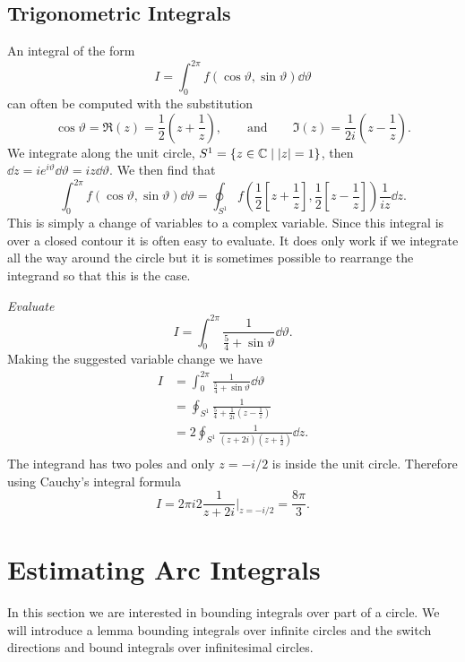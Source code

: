 \documentclass{article}
\newcommand{\st}{\mid}
\begin{document}
    \subsection{Trigonometric Integrals}
    An integral of the form
    \[I = \int_{0}^{2\pi} f(\cos\vartheta, \sin\vartheta) \dd{\vartheta}\]
    can often be computed with the substitution
    \[\cos\vartheta = \Re(z) = \frac{1}{2}\left( z + \frac{1}{z} \right), \qquad\text{and}\qquad \Im(z) = \frac{1}{2i}\left( z - \frac{1}{z} \right).\]
    We integrate along the unit circle, \(S^1 = \{z\in\complex \st \abs{z} = 1\}\), then \(\dd{z} = ie^{i\vartheta}\dd{\vartheta} = iz\dd{\vartheta}\).
    We then find that
    \[\int_{0}^{2\pi} f(\cos\vartheta, \sin\vartheta) \dd{\vartheta} = \oint_{S^1} f\left( \frac{1}{2}\left[ z + \frac{1}{z} \right], \frac{1}{2}\left[ z - \frac{1}{z} \right] \right) \frac{1}{iz} \dd{z}.\]
    This is simply a change of variables to a complex variable.
    Since this integral is over a closed contour it is often easy to evaluate.
    It does only work if we integrate all the way around the circle but it is sometimes possible to rearrange the integrand so that this is the case.
    
    \begin{example}
        \emph{Evaluate}
        \[I = \int_{0}^{2\pi} \frac{1}{\frac{5}{4} + \sin\vartheta} \dd{\vartheta}.\]
        Making the suggested variable change we have
        \begin{align*}
            I &= \int_{0}^{2\pi} \frac{1}{\frac{5}{4} + \sin\vartheta} \dd{\vartheta}\\
            &= \oint_{S^1} \frac{1}{\frac{5}{4} + \frac{1}{2i}\left(z - \frac{1}{z}\right)}\\
            &= 2\oint_{S^1} \frac{1}{(z + 2i)\left(z + \frac{i}{2}\right)} \dd{z}.\\
        \end{align*}
        The integrand has two poles and only \(z = -i/2\) is inside the unit circle.
        Therefore using Cauchy's integral formula
        \[I = 2\pi i 2\frac{1}{z + 2i}\bigg|_{z=-i/2} = \frac{8\pi}{3}.\]
    \end{example}
    
    \section{Estimating Arc Integrals}
    In this section we are interested in bounding integrals over part of a circle.
    We will introduce a lemma bounding integrals over infinite circles and the switch directions and bound integrals over infinitesimal circles.
    
\end{document}
